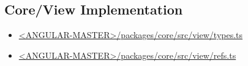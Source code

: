 \subsection{Core/View Implementation}


\begin{itemize}
  \item \href{https://github.com/angular/angular/blob/master/packages/core/src/view/types.ts}
        {<ANGULAR-MASTER>/packages/core/src/view/types.ts}
\end{itemize}








\begin{itemize}
  \item \href{https://github.com/angular/angular/blob/master/packages/core/src/view/refs.ts}
        {<ANGULAR-MASTER>/packages/core/src/view/refs.ts}
\end{itemize}










